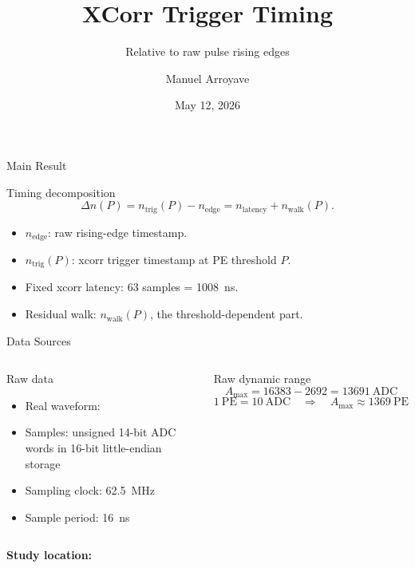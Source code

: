 \documentclass[aspectratio=169]{beamer}
\title[XCorr Trigger Timing]{XCorr Trigger Timing}
\subtitle{Relative to raw pulse rising edges}
\author{Manuel Arroyave}
\date{May 12, 2026}
\newcommand{\sampleperiod}{\SI{16}{\nano\second}}
\newcommand{\clockfreq}{\SI{62.5}{\mega\hertz}}
\newcommand{\fixedlatency}{\SI{1008}{\nano\second}}
\newcommand{\rawbaseline}{\num{2692}}
\newcommand{\rawmax}{\num{16383}}
\newcommand{\rawspan}{\num{13691}}
\newcommand{\rawrangepe}{\num{1369}}
\begin{document}
\begin{frame}
  \titlepage
\end{frame}

\begin{frame}{Main Result}
\small
\begin{block}{Timing decomposition}
\[
\Delta n(P)=n_{\mathrm{trig}}(P)-n_{\mathrm{edge}}
          = n_{\mathrm{latency}} + n_{\mathrm{walk}}(P).
\]
\end{block}

\begin{itemize}
  \item \(n_{\mathrm{edge}}\): raw rising-edge timestamp.
  \item \(n_{\mathrm{trig}}(P)\): xcorr trigger timestamp at PE threshold \(P\).
  \item Fixed xcorr latency: \(63\) samples = \fixedlatency.
  \item Residual walk: \(n_{\mathrm{walk}}(P)\), the threshold-dependent part.
\end{itemize}
\end{frame}

\begin{frame}{Data Sources}
\scriptsize
\begin{columns}[T,onlytextwidth]
\begin{block}{Raw data}
\begin{itemize}
  \item Real waveform: 
  \item Samples: unsigned 14-bit ADC words in 16-bit little-endian storage
  \item Sampling clock: \clockfreq
  \item Sample period: \sampleperiod
\end{itemize}
\end{block}

\begin{block}{Raw dynamic range}
\[
A_{\max} = \rawmax-\rawbaseline=\rawspan~\mathrm{ADC}
\]
\[
1~\mathrm{PE}=10~\mathrm{ADC}
\quad\Rightarrow\quad
A_{\max}\approx\rawrangepe~\mathrm{PE}
\]
\end{block}
\end{columns}

\vspace{0.2em}
\textbf{Study location:} 
\end{frame}
\end{document}
